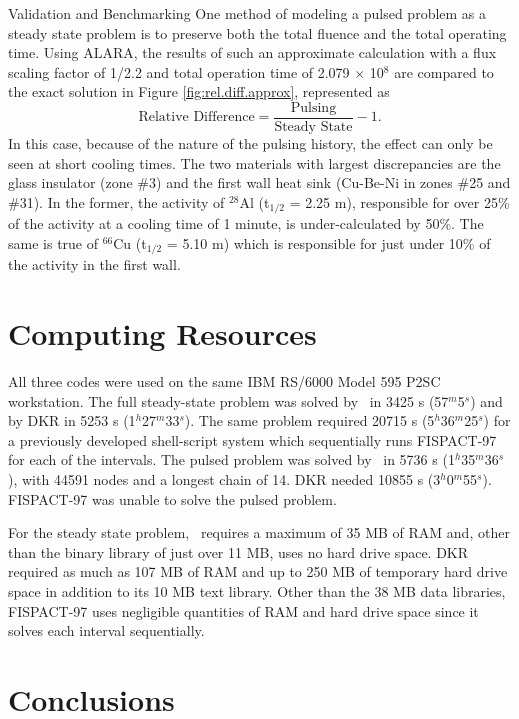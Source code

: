 \begin{chapter}{Validation and Benchmarking}
One method of modeling a pulsed problem as a steady state problem is
to preserve both the total fluence and the total operating
time\cite{sisolak,hosny,qingming}.  Using ALARA, the
results of such an approximate calculation with a flux scaling factor
of 1/2.2 and total operation time of 2.079 $\times$ 10$^8$ are
compared to the exact solution in Figure \ref{fig:rel.diff.approx},
represented as
$$\mbox{Relative Difference} = \frac{\mbox{Pulsing}}{\mbox{Steady
    State}} - 1.$$
In this case, because of the nature of the pulsing history, the effect
can only be seen at short cooling times.  The two materials with
largest discrepancies are the glass insulator (zone \#3) and the first
wall heat sink (Cu-Be-Ni in zones \#25 and \#31).  In the former, the
activity of $^{28}$Al (t$_{1/2}$ = 2.25 m), responsible for over 25\%
of the activity at a cooling time of 1 minute, is under-calculated by
50\%.  The same is true of $^{66}$Cu (t$_{1/2}$ = 5.10 m) which is
responsible for just under 10\% of the activity in the first wall.
    


\section{Computing Resources}

All three codes were used on the same IBM RS/6000 Model 595 P2SC
workstation.  The full steady-state problem was solved by \ALARA\ in
3425 s (57$^m$5$^s$) and by DKR in 5253 s (1$^h$27$^m$33$^s$).  The
same problem required 20715 s (5$^h$36$^m$25$^s$) for a previously
developed shell-script system which sequentially runs FISPACT-97 for
each of the intervals.  The pulsed problem was solved by \ALARA\ in 5736
s (1$^h$35$^m$36$^s$), with 44591 nodes and a longest chain of 14.
DKR needed 10855 s (3$^h$0$^m$55$^s$).  FISPACT-97 was unable to solve
the pulsed problem.

For the steady state problem, \ALARA\ requires a maximum of 35 MB of RAM
and, other than the binary library of just over 11 MB, uses no hard
drive space.  DKR required as much as 107 MB of RAM and up to
250 MB of temporary hard drive space in addition to its 10 MB text
library.  Other than the 38 MB data libraries, FISPACT-97 uses
negligible quantities of RAM and hard drive space since it solves each
interval sequentially.


\section{Conclusions}


\end{chapter}
